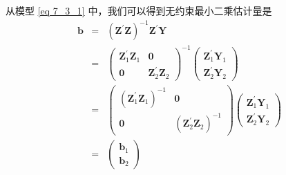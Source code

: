 		从模型 \ref{eq 7_3_1}  中，我们可以得到无约束最小二乘估计量是
		\begin{eqnarray*}
			\boldsymbol{b} & = & \left(\boldsymbol{Z}^{\prime} \boldsymbol{Z}\right)^{-1} \boldsymbol{Z}^{\prime} \boldsymbol{Y} \\
			 & = & \left(\begin{array}{cc}
			\boldsymbol{Z}_{1}^{\prime} \boldsymbol{Z}_{1} & \boldsymbol{0} \\
			\boldsymbol{0} & \boldsymbol{Z}_{2}^{\prime} \boldsymbol{Z}_{2}
			\end{array}\right)^{-1}\left(\begin{array}{c}
			\boldsymbol{Z}_{1}^{\prime} \boldsymbol{Y}_{1} \\
			\boldsymbol{Z}_{2}^{\prime} \boldsymbol{Y}_{2} \end{array}\right) \\
		    & = & \left(\begin{array}{cc}
			\left(\boldsymbol{Z}_{1}^{\prime} \boldsymbol{Z}_{1}\right)^{-1} & \boldsymbol{0} \\ 
			\boldsymbol{0} & \left(\boldsymbol{Z}_{2}^{\prime} \boldsymbol{Z}_{2}\right)^{-1}
			\end{array}\right)\left(\begin{array}{c}
			\boldsymbol{Z}_{1}^{\prime} \boldsymbol{Y}_{1} \\
			\boldsymbol{Z}_{2}^{\prime} \boldsymbol{Y}_{2}
			\end{array}\right) \\
		     & = & \left(\begin{array}{c}
			\boldsymbol{b}_{1} \\
			\boldsymbol{b}_{2}
			\end{array}\right)		
		\end{eqnarray*}

